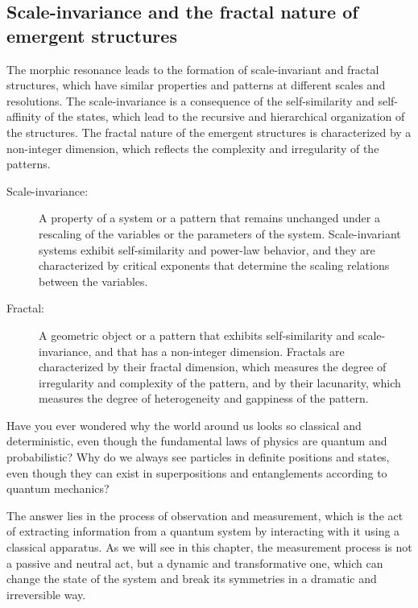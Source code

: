 \subsection{Scale-invariance and the fractal nature of emergent structures}
The morphic resonance leads to the formation of scale-invariant and fractal structures, which have similar properties and patterns at different scales and resolutions. The scale-invariance is a consequence of the self-similarity and self-affinity of the states, which lead to the recursive and hierarchical organization of the structures. The fractal nature of the emergent structures is characterized by a non-integer dimension, which reflects the complexity and irregularity of the patterns.

\begin{tcolorbox}[colback=blue!5!white,colframe=blue!75!black,title=New terms]
\begin{description}
\item[Scale-invariance:] A property of a system or a pattern that remains unchanged under a rescaling of the variables or the parameters of the system. Scale-invariant systems exhibit self-similarity and power-law behavior, and they are characterized by critical exponents that determine the scaling relations between the variables.
\item[Fractal:] A geometric object or a pattern that exhibits self-similarity and scale-invariance, and that has a non-integer dimension. Fractals are characterized by their fractal dimension, which measures the degree of irregularity and complexity of the pattern, and by their lacunarity, which measures the degree of heterogeneity and gappiness of the pattern.
\end{description}
\end{tcolorbox}
Have you ever wondered why the world around us looks so classical and deterministic, even though the fundamental laws of physics are quantum and probabilistic? Why do we always see particles in definite positions and states, even though they can exist in superpositions and entanglements according to quantum mechanics?

The answer lies in the process of observation and measurement, which is the act of extracting information from a quantum system by interacting with it using a classical apparatus. As we will see in this chapter, the measurement process is not a passive and neutral act, but a dynamic and transformative one, which can change the state of the system and break its symmetries in a dramatic and irreversible way.

